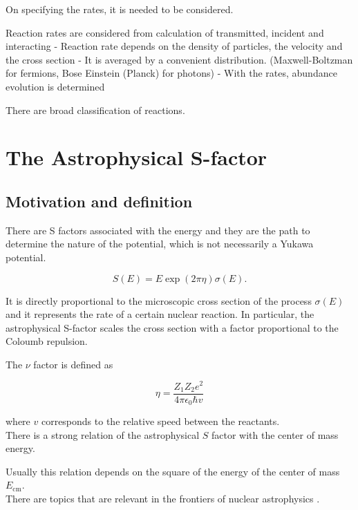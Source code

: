 \documentclass[openany]{book}
\begin{document}
On specifying the rates, it is needed to be considered.

Reaction rates are considered from calculation of transmitted, incident and interacting 
- Reaction rate depends on the density of particles, the velocity and the cross section
-	It is averaged by a convenient distribution. (Maxwell-Boltzman for fermions, Bose Einstein (Planck) for photons)
-	With the rates, abundance evolution is determined 

There are broad classification of reactions. 

\section{The Astrophysical S-factor} \label{sec:sFactor}
\subsection{Motivation and definition} \label{sub:sfactorMotivationDefinition}

There are S factors associated with the energy and they are the path to determine the nature of the potential, which is not necessarily a Yukawa potential.

\begin{equation} \label{eq:sfactor_definition}
	S(E) = E \exp({2\pi\eta}) \sigma({E}).
\end{equation} %

It is directly proportional to the microscopic cross section of the process $\sigma(E)$ and it represents the rate of a certain nuclear reaction. 
In particular, the astrophysical S-factor 	scales the cross section with a factor proportional to the Coloumb repulsion. 

The $\nu$ factor is defined as 

\begin{equation} \label{eq:sfactor_sommerfeld}
	\eta = \frac{Z_1Z_2e^2}{4\pi\epsilon_0\hbar v}
\end{equation}

where $v$ corresponds to the relative speed between the reactants. \\ 
There is a strong relation of the astrophysical $S$ factor with the center of mass energy. 

Usually this relation depends on the square of the energy of the center of mass $E_{\mathrm{cm}}$. \\

There are topics that are relevant in the frontiers of nuclear astrophysics  \cite{bertulani_kajino_2016}. 
\end{document}
